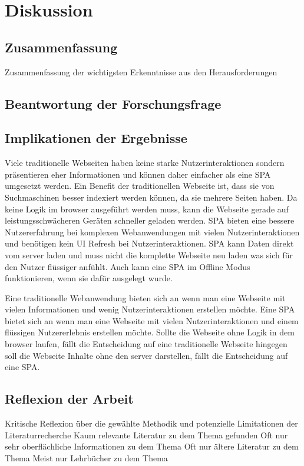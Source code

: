 \section{Diskussion}
\subsection{Zusammenfassung}
Zusammenfassung der wichtigsten Erkenntnisse aus den Herausforderungen
\subsection{Beantwortung der Forschungsfrage}

\subsection{Implikationen der Ergebnisse}
Viele traditionelle Webseiten haben keine starke Nutzerinteraktionen sondern präsentieren eher Informationen und können daher
einfacher als eine \ac{SPA} umgesetzt werden. Ein Benefit der traditionellen Webseite ist, dass sie von Suchmaschinen besser indexiert werden können, da sie mehrere Seiten haben.
Da keine Logik im \gls{browser} ausgeführt werden muss, kann die Webseite gerade auf leistungsschwächeren Geräten schneller geladen werden.
\ac{SPA} bieten eine bessere Nutzererfahrung bei komplexen Webanwendungen mit vielen Nutzerinteraktionen und benötigen kein \ac{UI} Refresh bei Nutzerinteraktionen.
\ac{SPA} kann Daten direkt vom \gls{server} laden und muss nicht die komplette Webseite neu laden was sich für den Nutzer flüssiger anfühlt.
Auch kann eine \ac{SPA} im Offline Modus funktionieren, wenn sie dafür ausgelegt wurde.

Eine traditionelle Webanwendung bieten sich an wenn man eine Webseite mit vielen Informationen und wenig Nutzerinteraktionen erstellen möchte.
Eine \ac{SPA} bietet sich an wenn man eine Webseite mit vielen Nutzerinteraktionen und einem flüssigen Nutzererlebnis erstellen möchte.
Sollte die Webseite ohne Logik in dem \gls{browser} laufen, fällt die Entscheidung auf eine traditionelle Webseite hingegen
soll die Webseite Inhalte ohne den \gls{server} darstellen, fällt die Entscheidung auf eine \ac{SPA}.

\subsection{Reflexion der Arbeit}
Kritische Reflexion über die gewählte Methodik und potenzielle Limitationen der Literaturrecherche
Kaum relevante Literatur zu dem Thema gefunden
Oft nur sehr oberflächliche Informationen zu dem Thema
Oft nur ältere Literatur zu dem Thema
Meist nur Lehrbücher zu dem Thema